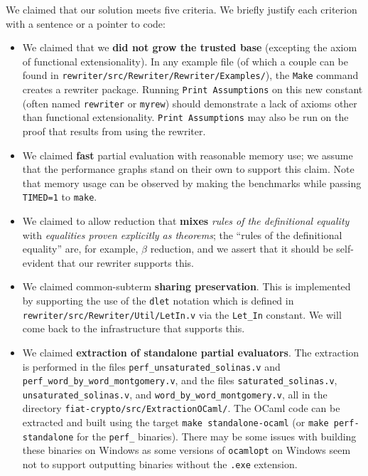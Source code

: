 \begin{subappendices}
We claimed that our solution meets five criteria.
We briefly justify each criterion with a sentence or a pointer to code:
\begin{itemize}
  \item
    We claimed that we \textbf{did not grow the trusted base} (excepting the axiom of functional extensionality).
    In any example file (of which a couple can be found in \texttt{rewriter/src/Rewriter/Rewriter/Examples/}), the \texttt{Make} command creates a rewriter package.
    Running \texttt{Print Assumptions} on this new constant (often named \texttt{rewriter} or \texttt{myrew}) should demonstrate a lack of axioms other than functional extensionality.
    \texttt{Print Assumptions} may also be run on the proof that results from using the rewriter.
  \item
    We claimed \textbf{fast} partial evaluation with reasonable memory use; we assume that the performance graphs stand on their own to support this claim.
    Note that memory usage can be observed by making the benchmarks while passing \texttt{TIMED=1} to \texttt{make}.
  \item
    We claimed to allow reduction that \textbf{mixes} \emph{rules of the definitional equality} with \emph{equalities proven explicitly as theorems}; the ``rules of the definitional equality'' are, for example, $\beta$ reduction, and we assert that it should be self-evident that our rewriter supports this.
  \item
    We claimed common-subterm \textbf{sharing preservation}.
    This is implemented by supporting the use of the \texttt{dlet} notation which is defined in \texttt{rewriter/src/Rewriter/Util/LetIn.v} via the \texttt{Let\_In} constant.
    We will come back to the infrastructure that supports this.
  \item
    We claimed \textbf{extraction of standalone partial evaluators}.
    The extraction is performed in the files \texttt{perf\_unsaturated\_solinas.v} and \texttt{perf\_word\_by\_word\_montgomery.v}, and the files \texttt{saturated\_solinas.v}, \texttt{unsaturated\_solinas.v}, and \texttt{word\_by\_word\_montgomery.v}, all in the directory \texttt{fiat-crypto/src/ExtractionOCaml/}.
    The OCaml code can be extracted and built using the target \texttt{make standalone-ocaml} (or \texttt{make perf-standalone} for the \texttt{perf\_} binaries).
    There may be some issues with building these binaries on Windows as some versions of \texttt{ocamlopt} on Windows seem not to support outputting binaries without the \texttt{.exe} extension.
\end{itemize}


\end{subappendices}
